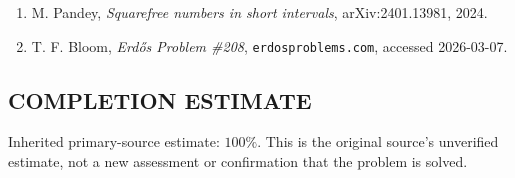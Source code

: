 \begin{enumerate}
\item M. Pandey, \emph{Squarefree numbers in short intervals}, arXiv:2401.13981, 2024.
\item T. F. Bloom, \emph{Erd\H{o}s Problem \#208}, \texttt{erdosproblems.com}, accessed 2026-03-07.
\end{enumerate}


\subsection*{COMPLETION ESTIMATE}
Inherited primary-source estimate: $100\%$. This is the original source's unverified estimate, not a new assessment or confirmation that the problem is solved.
